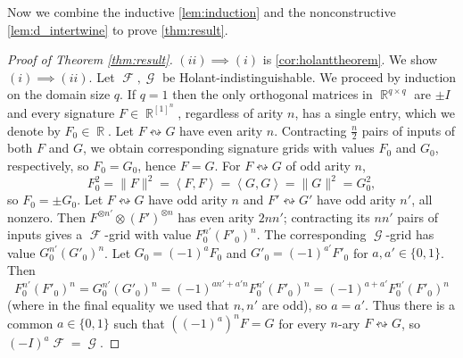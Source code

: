 \documentclass{article}
\DeclareMathOperator{\rr}{\mathbb{R}}
\DeclareMathOperator{\fc}{\mathcal{F}}
\DeclareMathOperator{\gc}{\mathcal{G}}
\begin{document}
Now we combine the inductive \autoref{lem:induction} and the nonconstructive 
\autoref{lem:d_intertwine} to prove \autoref{thm:result}.
\begin{proof}[Proof of Theorem \ref{thm:result}]
    $(ii) \implies (i)$ is \autoref{cor:holanttheorem}.
    We show $(i) \implies (ii)$. Let $\fc,\gc$ be Holant-indistinguishable.
    We proceed by induction on the domain size $q$. If $q = 1$ then the only orthogonal matrices
    in $\rr^{q \times q}$ are $\pm I$ and every signature $F \in \rr^{[1]^n}$, regardless of arity $n$, 
    has a single entry, which we denote by $F_0 \in \rr$. Let $F \leftrightsquigarrow G$ have
    even arity $n$. Contracting $\frac{n}{2}$ pairs of inputs of both $F$ and $G$, 
    we obtain corresponding signature grids with values $F_0$ and $G_0$, respectively, so $F_0 = G_0$, hence
    $F = G$. For $F \leftrightsquigarrow G$ of odd arity $n$, 
    \[
        F_0^2 = \|F\|^2 = \left\langle F,F\right\rangle = \left\langle G,G\right\rangle = \|G\|^2 = G_0^2,
    \]
    so $F_0 = \pm G_0$. Let $F \leftrightsquigarrow G$ have odd arity $n$
    and $F' \leftrightsquigarrow G'$ have odd arity $n'$, all nonzero. Then
    $F^{\otimes n'} \otimes (F')^{\otimes n}$
    has even arity $2nn'$; contracting its $nn'$ pairs of inputs gives a $\fc$-grid
    with value $F_0^{n'}(F'_0)^n$. The corresponding $\gc$-grid has value
    $G_0^{n'}(G'_0)^n$. Let $G_0 = (-1)^aF_0$ and $G'_0 = (-1)^{a'} F'_0$ for $a,a'\in \{0,1\}$. Then
    \[
        F_0^{n'} (F'_0)^n = G_0^{n'}(G'_0)^n = (-1)^{an' + a'n}F_0^{n'}(F'_0)^n
        = (-1)^{a + a'}F_0^{n'}(F'_0)^n
    \]
    (where in the final equality we used that $n,n'$ are odd), so $a = a'$. Thus there is a common
    $a \in \{0,1\}$ such that $((-1)^a)^n F = G$ for every $n$-ary $F \leftrightsquigarrow G$,
    so $(-I)^a \fc = \gc$.


\end{proof}
\end{document}
